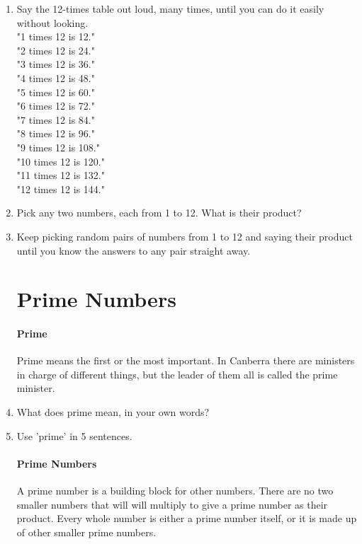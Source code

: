 \documentclass[12pt]{article}
\begin{document}
\begin{enumerate}
\item Say the 12-times table out loud, many times, until you can do it easily without looking.\\

"1 times 12 is 12."\\
"2 times 12 is 24."\\
"3 times 12 is 36."\\
"4 times 12 is 48."\\
"5 times 12 is 60."\\
"6 times 12 is 72."\\
"7 times 12 is 84."\\
"8 times 12 is 96."\\
"9 times 12 is 108."\\
"10 times 12 is 120."\\
"11 times 12 is 132."\\
"12 times 12 is 144."\\

\item Pick any two numbers, each  from 1 to 12. What is their product?
\item Keep picking random pairs of numbers from 1 to 12 and saying their product until you know the answers to any pair straight away.

\section*{Prime Numbers}

\paragraph{Prime}
Prime means the first or the most important. In Canberra there are ministers in charge of different things, but the leader of them all is called the prime minister.\\

\item What does prime mean, in your own words?
\item Use 'prime' in 5 sentences.

\paragraph{Prime Numbers}
A prime number is a building block for other numbers. There are no two smaller numbers that will will multiply to give a prime number as their product. Every whole number is either a prime number itself, or it is made up of other smaller prime numbers.


\end{enumerate}
\end{document}
